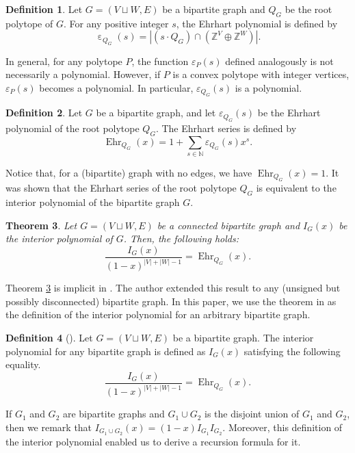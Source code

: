 \documentclass{amsart}
\newtheorem{theorem}{Theorem}[section]
\theoremstyle{definition}
\newtheorem{definition}[theorem]{Definition}
\theoremstyle{remark}
\DeclareMathOperator{\Ehr}{Ehr}
\DeclareMathOperator{\ehr}{\varepsilon}
\numberwithin{equation}{section}
\begin{document}
\begin{definition}
Let $G=(V\sqcup W,E)$ be a bipartite graph and $Q_G$ be the root polytope of $G$. For any positive integer $s$, the Ehrhart polynomial is defined by
\[
\ehr_{Q_G}(s) = |(s\cdot Q_G) \cap (\mathbb{Z}^{V}\oplus\mathbb{Z}^{W})|.
\]
\end{definition}

In general, for any polytope $P$, the function $\varepsilon_P(s)$ defined analogously is not necessarily a polynomial. However, if $P$ is a convex polytope with integer vertices, $\varepsilon_P(s)$ becomes a polynomial. In particular, $\varepsilon_{Q_G}(s)$ is a polynomial.

\begin{definition}
Let $G$ be a bipartite graph, and let $\varepsilon_{Q_G}(s)$ be the Ehrhart polynomial of the root polytope $Q_G$. The Ehrhart series is defined by
\[
\Ehr_{Q_G}(x)=1+\sum_{s\in \mathbb{N}}\varepsilon_{Q_G}(s)x^s.
\]
\end{definition}


Notice that, for a (bipartite) graph with no edges, we have $\Ehr_{Q_G}(x)=1$. It was shown that the Ehrhart series of the root polytope $Q_G$ is equivalent to the interior polynomial of the bipartite graph $G$. 


\begin{theorem}\label{lem:serint}
Let $G=(V\sqcup W,E)$ be a connected bipartite graph and $I_G(x)$ be the interior polynomial of $G$. Then, the following holds:
\[
\frac{I_G(x)}{(1-x)^{|V|+|W|-1}}=\Ehr_{Q_G}(x).
\]
\end{theorem}


Theorem \ref{lem:serint} is implicit in \cite{KP}. The author extended this result to any (unsigned but possibly disconnected) bipartite graph. In this paper, we use the theorem in \cite{kato} as the definition of the interior polynomial for an arbitrary bipartite graph.


\begin{definition}[\cite{kato}]\label{thm:disserint}
Let $G=(V\sqcup W,E)$ be a bipartite graph. The interior polynomial for any bipartite graph is defined as $I_G(x)$ satisfying the following equality.
\[
\frac{I_G(x)}{(1-x)^{|V|+|W|-1}}=\Ehr_{Q_G}(x).
\]
\end{definition}

If $G_1$ and $G_2$ are bipartite graphs and $G_1\cup G_2$ is the disjoint union of $G_1$ and $G_2$, then we remark that $I_{G_1\cup G_2}(x)=(1-x)I_{G_1}I_{G_2}$. Moreover, this definition of the interior polynomial enabled us to derive a recursion formula for it.
\end{document}
